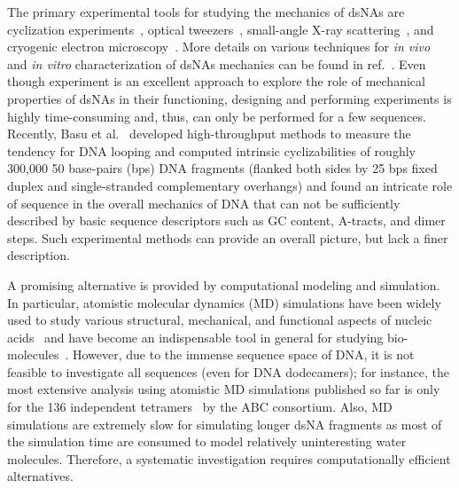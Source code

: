 The primary experimental tools for studying the mechanics of dsNAs are cyclization experiments~\cite{cycle1}, optical tweezers~\cite{optical1}, small-angle X-ray scattering~\cite{pollack2}, and cryogenic electron microscopy~\cite{cryoem,demurtas2009bending}.
More details on various techniques for \textit{in vivo} and \textit{in vitro} characterization of dsNAs mechanics can be found in ref.~\cite{peters2010dna}.
Even though experiment is an excellent approach to explore the role of mechanical properties of dsNAs in their functioning, designing and performing experiments is highly time-consuming and, thus, can only be performed for a few sequences.
Recently, Basu et al.~\cite{basu2021measuring} developed high-throughput methods to measure the tendency for DNA looping and computed intrinsic cyclizabilities of roughly 300,000 50 base-pairs (bps) DNA fragments (flanked both sides by 25 bps fixed duplex and single-stranded complementary overhangs) and found an intricate role of sequence in the overall mechanics of DNA that can not be sufficiently described by basic sequence descriptors such as GC content, A-tracts, and dimer steps.
Such experimental methods can provide an overall picture, but lack a finer description.

A promising alternative is provided by computational modeling and simulation.
In particular, atomistic molecular dynamics (MD) simulations have been widely used to study various structural, mechanical, and functional aspects of nucleic acids~\cite{marin2019sequence,hospital2015molecular,noy2005structure,suresh2014dna,noy2008theoretical,pasi2014muabc,dixit2005molecular,lankavs2003dna,battistini2021impact,carvalho2014understanding,perez2004relative,fujii2007sequence,perez2012impact,perez2008towards,perez2007dynamics,balaceanu2019modulation,orozco2003theoretical} and have become an indispensable tool in general for studying bio-molecules~\cite{hospital2015molecular}.
However, due to the immense sequence space of DNA, it is not feasible to investigate all sequences (even for DNA dodecamers); for instance, the most extensive analysis using atomistic MD simulations published so far is only for the 136 independent tetramers~\cite{pasi2014muabc,dixit2005molecular} by the ABC consortium.
Also, MD simulations are extremely slow for simulating longer dsNA fragments as most of the simulation time are consumed to model relatively uninteresting water molecules.
Therefore, a systematic investigation requires computationally efficient alternatives.

